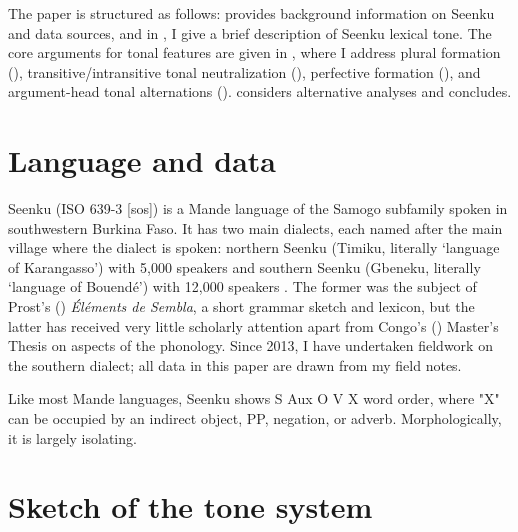 \documentclass[output=paper]{langsci/langscibook}
\begin{document}
The paper is structured as follows:  provides background information on Seenku and data sources, and in , I give a brief description of Seenku lexical tone. The core arguments for tonal features are given in , where I address plural formation (), transitive/intransitive tonal neutralization (), perfective formation (), and argument-head tonal alternations ().  considers alternative analyses and  concludes.





\section{Language and data}\label{sec:mcpherson:SecBackground}


Seenku (ISO 639-3 [sos]) is a Mande language of the Samogo subfamily spoken in southwestern Burkina Faso. It has two main dialects, each named after the main village where the dialect is spoken: northern Seenku (Timiku, literally `language of Karangasso') with 5,000 speakers and southern Seenku (Gbeneku, literally `language of Bouend\'e') with 12,000 speakers \citep{Ethnologue}. The former was the subject of Prost's (\citeyear{Prost71}) {\it \'El\'ements de Sembla}, a short grammar sketch and lexicon, but the latter has received very little scholarly attention apart from Congo's (\citeyear{Congo13}) Master's Thesis on aspects of the phonology. Since 2013, I have undertaken fieldwork on the southern dialect; all data in this paper are drawn from my field notes.

Like most Mande languages, Seenku shows S Aux O V X word order, where "X" can be occupied by an indirect object, PP, negation, or adverb. Morphologically, it is largely isolating.

\section{Sketch of the tone system}\label{sec:mcpherson:SecTone}
\end{document}
